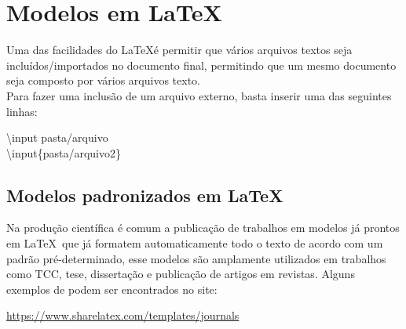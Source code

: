 \section{Modelos em \LaTeX}

\begin{frame}
    Uma das facilidades do \LaTeX é  permitir que vários arquivos textos seja incluídos/importados no documento final, permitindo que um mesmo documento seja composto por vários arquivos texto.\\
    Para fazer uma inclusão de um arquivo externo, basta inserir uma das seguintes linhas:

\vspace{1cm}
\begin{center}
    {\ttfamily \textbackslash input {pasta/arquivo}}\\
    {\ttfamily \textbackslash input\{pasta/arquivo2\}}
\end{center}

\end{frame}


\begin{frame}
\subsection*{Modelos padronizados em \LaTeX} %

Na produção científica é comum a publicação de trabalhos em modelos já  prontos em \LaTeX~que já formatem automaticamente todo o texto de acordo com um padrão pré-determinado, esse modelos são amplamente utilizados em trabalhos como TCC, tese, dissertação e publicação de artigos em revistas. Alguns exemplos de podem ser encontrados no site:

\begin{center}
\url{https://www.sharelatex.com/templates/journals}
\end{center}
\end{frame}


